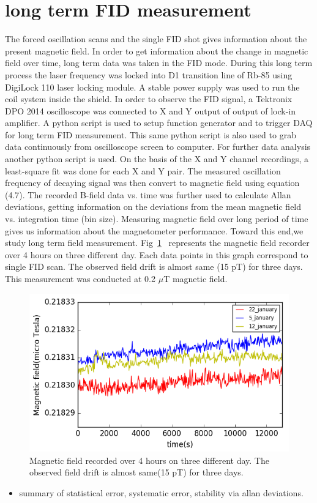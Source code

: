   \section{long term FID measurement}  
The forced oscillation scans and the single FID shot gives information about the present magnetic field. In order to get information about the change in magnetic field over time, long term data was taken in the FID mode. During this long term process the laser frequency was locked into D1 transition line of Rb-85 using DigiLock 110 laser locking module. A stable power supply was used to run the coil system inside the shield. In order to observe the FID signal, a Tektronix DPO 2014 oscilloscope was connected to X and Y output of output of lock-in amplifier. A python script is used to setup function generator and to trigger DAQ for long term FID measurement. This same python script is also used to grab data continuously from oscilloscope screen to computer. For further data analysis  another python script is used. On the basis of the X
and Y channel recordings, a least-square fit was done for each X and Y pair. The measured oscillation frequency of decaying signal was then convert to magnetic field using equation (4.7). The recorded B-field data vs. time was further used to calculate Allan deviations, getting  information on the deviations from the mean magnetic field vs. integration time (bin size). Measuring magnetic field over long period of time gives us information about the magnetometer performance. Toward this end,we study long term field measurement. Fig~\ref{fig:long term field} ~represents the magnetic field recorder over 4 hours on three different day. Each data points in this graph correspond to single FID scan. The observed field drift is almost same (15 pT) for three days. This measurement was conducted at 0.2 $\mu$T magnetic field.
\begin{figure}[h]
\centering\includegraphics[width=0.85\linewidth]{figures/field_3_day}
\caption{Magnetic field recorded over 4 hours on three different day. The observed field drift is almost same(15 pT) for three days.\label{fig:long term field}}
\end{figure}
   \begin{itemize}
   \item summary of statistical error, systematic error, stability via allan deviations.
   \end{itemize}
   \newpage
